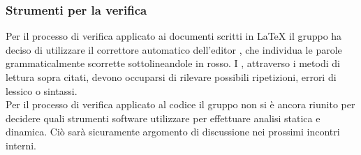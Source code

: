 \subsubsection{Strumenti per la verifica}
Per il processo di verifica applicato ai documenti scritti in \LaTeX{} il gruppo ha deciso di utilizzare il correttore automatico dell'editor , che individua le parole grammaticalmente scorrette sottolineandole in rosso. I , attraverso i metodi di lettura sopra citati, devono occuparsi di rilevare possibili ripetizioni, errori di lessico o sintassi.  \\
\linebreak
Per il processo di verifica applicato al codice il gruppo non si è ancora riunito per decidere quali strumenti software utilizzare per effettuare analisi statica e dinamica. Ciò sarà sicuramente argomento di discussione nei prossimi incontri interni.